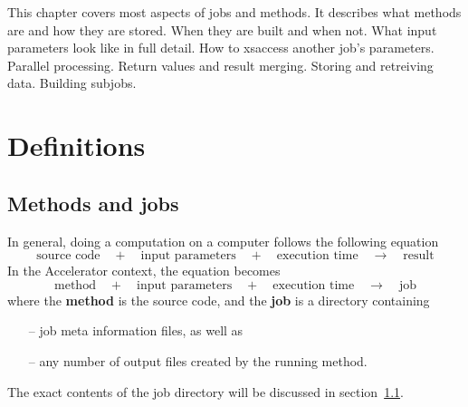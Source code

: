 

This chapter covers most aspects of jobs and methods.  It describes
what methods are and how they are stored.  When they are built and
when not.  What input parameters look like in full detail.  How to
xsaccess another job's parameters.  Parallel processing.  Return values
and result merging.  Storing and retreiving data.  Building subjobs.



\section{Definitions}

\subsection{Methods and jobs}

In general, doing a computation on a computer follows the following equation
\[
  \text{source code} \quad+\quad \text{input parameters} \quad+\quad \text{execution time} \quad\rightarrow\quad \text{result}
\]
In the Accelerator context, the equation becomes
\[
  \text{method} \quad+\quad \text{input parameters} \quad+\quad \text{execution time} \quad\rightarrow\quad \text{job}
\]
where the \textbf{method} is the source code, and the \textbf{job} is
a directory containing
\begin{itemize}
\item[--] job meta information files,  as well as
\item[--] any number of output files created by the running method.
\end{itemize}
The exact contents of the job directory will be discussed in section~\ref{}.

